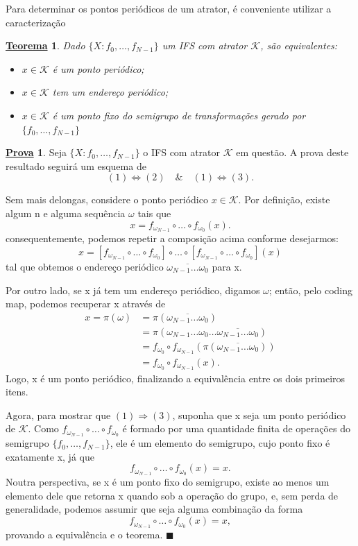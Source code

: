 \documentclass[12pt]{article}
\newtheorem*{theorem*}{\underline{Teorema}}
\theoremstyle{definition}
\newtheorem*{proof*}{\underline{Prova}}
\renewcommand\qedsymbol{$\blacksquare$}
\begin{document}
Para determinar os pontos periódicos de um atrator, é conveniente utilizar a caracterização
\begin{theorem*}
	Dado \(\{X: f_{0}, \dotsc , f_{N-1}\}\) um IFS com atrator \(\mathcal{K}\), são equivalentes:
	\begin{itemize}
		\item[1)] \(x\in \mathcal{K}\) é um ponto periódico;
		\item[2)] \(x\in \mathcal{K}\) tem um endereço periódico;
		\item[3)] \(x\in \mathcal{K}\) é um ponto fixo do semigrupo de transformações gerado por \(\{f_{0}, \dotsc , f_{N-1}\}\)
	\end{itemize}
\end{theorem*}
\begin{proof*}
	Seja \(\{X: f_{0}, \dotsc , f_{N-1}\}\) o IFS com atrator \(\mathcal{K}\) em questão. A prova deste resultado seguirá um esquema de
	\[
		(1) \Longleftrightarrow (2) \quad\&\quad (1)\Longleftrightarrow (3).
	\]

	Sem mais delongas, considere o ponto periódico \(x\in \mathcal{K}\). Por definição, existe algum n e alguma sequência \(\omega \) tais que
	\[
		x = f_{\omega_{N-1}}\circ \dotsc \circ f_{\omega_0}(x).
	\]
	consequentemente, podemos repetir a composição acima conforme desejarmos:
	\[
		x = [f_{\omega_{N-1}}\circ \dotsc \circ f_{\omega_0}] \circ \dotsc \circ  [f_{\omega_{N-1}}\circ \dotsc \circ f_{\omega_0}](x)
	\]
	tal que obtemos o endereço periódico \(\overline{\omega_{N-1}\dotsc \omega_{0}}\) para x.

	Por outro lado, se x já tem um endereço periódico, digamos \(\omega\); então, pelo coding map, podemos recuperar x através de
	\begin{align*}
		x = \pi (\omega ) & = \pi (\overline{\omega_{N-1}\dotsc \omega_{0}})                                       \\
		                  & = \pi (\omega_{N-1}\dotsc  \omega_{0} \dotsc \overline{\omega_{N-1}\dotsc \omega_{0}}) \\
		                  & = f_{\omega_{0}}\circ f_{\omega_{N-1}}(\pi (\overline{\omega_{N-1}\dotsc \omega_{0}})) \\
		                  & = f_{\omega_{0}}\circ f_{\omega_{N-1}}(x).
	\end{align*}
	Logo, x é um ponto periódico, finalizando a equivalência entre os dois primeiros itens.

	Agora, para mostrar que \((1) \Rightarrow (3)\), suponha que x seja um ponto periódico de \(\mathcal{K}\). Como \(f_{\omega_{N-1}}\circ \dotsc \circ f_{\omega_{0}}\) é formado por uma quantidade finita de operações do semigrupo \(\{f_{0}, \dotsc , f_{N-1}\}\), ele é um elemento do semigrupo, cujo ponto fixo é exatamente x, já que
	\[
		f_{\omega_{N-1}} \circ \dotsc \circ f_{\omega_{0}} (x) = x.
	\]
	Noutra perspectiva, se x é um ponto fixo do semigrupo, existe ao menos um elemento dele que retorna x quando sob a operação do grupo, e, sem perda de generalidade, podemos assumir que seja alguma combinação da forma
	\[
		f_{\omega_{N-1}}\circ \dotsc \circ f_{\omega_{0}}(x) = x,
	\]
	provando a equivalência e o teorema. \qedsymbol
\end{proof*}
\end{document}
